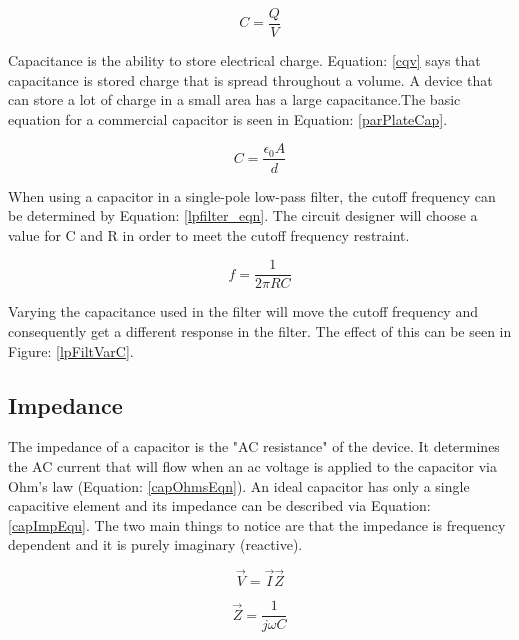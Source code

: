 \begin{equation}
\label{cqv}
C=\frac{Q}{V}
\end{equation}

Capacitance is the ability to store electrical charge. Equation: \eqref{cqv} says that capacitance is stored charge that is spread throughout a volume. A device that can store a lot of charge in a small area has a large capacitance.The basic equation for a commercial capacitor is seen in Equation: \eqref{parPlateCap}.

\begin{equation}
\label{parPlateCap}
C = \frac{\epsilon _0 A}{d}
\end{equation}

When using a capacitor in a single-pole low-pass filter, the cutoff frequency can be determined by Equation: \eqref{lpfilter_eqn}. The circuit designer will choose a value for C and R in order to meet the cutoff frequency restraint.

\begin{equation}
\label{lpfilter_eqn}
f = \frac{1}{2\pi RC}
\end{equation}

Varying the capacitance used in the filter will move the cutoff frequency and consequently get a different response in the filter. The effect of this can be seen in Figure: \ref{lpFiltVarC}.




\subsection{Impedance}

The impedance of a capacitor is the "AC resistance" of the device. It determines the AC current that will flow when an ac voltage is applied to the capacitor via Ohm's law (Equation: \eqref{capOhmsEqn}). An ideal capacitor has only a single capacitive element and its impedance can be described via Equation: \eqref{capImpEqu}. The two main things to notice are that the impedance is frequency dependent and it is purely imaginary (reactive).

\begin{equation}
\label{capOhmsEqn}
\vec{V} = \vec{I} \vec{Z}
\end{equation}

\begin{equation}
\label{capImpEqu}
\vec{Z} = \frac{1}{j\omega C}
\end{equation}

